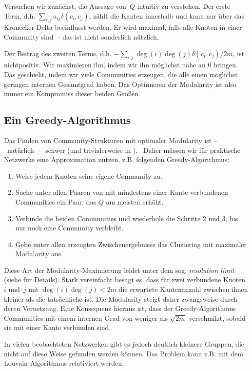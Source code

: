 Versuchen wir zunächst, die Aussage von~$Q$ intuitiv zu verstehen.
Der erste Term, d.h. $\sum_{i,j} a_{ij} \delta(c_i, c_j)$, zählt die Kanten innerhalb und kann nur über das Kronecker-Delta beeinflusst werden.
Er wird maximal, falls alle Knoten in einer Community sind~-- das ist nicht sonderlich nützlich.

Der Beitrag des zweiten Terms, d.h. $-\sum_{i,j} \deg(i)\deg(j) \delta(c_i, c_j)/2m$, ist nichtpositiv.
Wir maximieren ihn, indem wir ihn möglichst nahe an $0$ bringen.
Das geschieht, indem wir viele Communities erzeugen, die alle einen möglichst geringen internen Gesamtgrad haben.
Das Optimieren der Modularity ist also immer ein Kompromiss dieser beiden Größen.

\subsection{Ein Greedy-Algorithmus}
Das Finden von Community-Strukturen mit optimaler Modularity ist --~natürlich~-- \NP-schwer (und trivialerweise in \NP).~\cite{DBLP:journals/tkde/BrandesDGGHNW08}
Daher müssen wir für praktische Netzwerke eine Approximation nutzen, z.B. folgenden Greedy-Algorithmus:

\begin{enumerate}
    \item Weise jedem Knoten seine eigene Community zu.
    \item Suche unter allen Paaren von mit mindestens einer Kante verbundenen Communities ein Paar, das $Q$ am meisten erhöht.
    \item Verbinde die beiden Communities und wiederhole die Schritte 2 und 3, bis nur noch eine Community verbleibt.
    \item Gebe unter allen erzeugten Zwischenergebnisse das Clustering mit maximaler Modularity aus.
\end{enumerate}

Diese Art der Modularity-Maximierung leidet unter dem sog. \emph{resolution limit} (siehe \cite{barabasi2014network} für Details).
Stark vereinfacht besagt es, dass für zwei verbundene Knoten $i$ und~$j$ mit $\deg(i) \deg(j) < 2m$ die erwartete Kantenanzahl zwischen ihnen kleiner als die tatsächliche ist.
Die Modularity steigt daher zwangsweise durch deren Vernetzung.
Eine Konsequenz hieraus ist, dass der Greedy-Algorithmus Communities mit einem internen Grad von weniger als $\sqrt{2m}$ verschmilzt, sobald sie mit einer Kante verbunden sind.

In vielen beobachteten Netzwerken gibt es jedoch deutlich kleinere Gruppen, die nicht auf diese Weise gefunden werden können.
Das Problem kann z.B. mit dem Louvain-Algorithmus relativiert werden.
